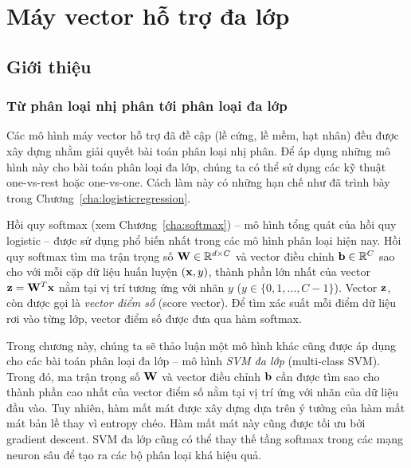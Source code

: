 \chapter{Máy vector hỗ trợ đa lớp}
\label{cha:multisvm}
\section{Giới thiệu }


\subsection{Từ phân loại nhị phân tới phân loại đa lớp}

Các mô hình máy vector hỗ trợ đã đề cập (lề cứng, lề mềm, hạt nhân) đều được xây
dựng nhằm giải quyết bài toán phân loại nhị phân. Để áp dụng những mô hình này
cho bài toán phân loại đa lớp, chúng ta có thể sử dụng các kỹ thuật one-vs-rest
hoặc one-vs-one. Cách làm này có những hạn chế như đã trình bày trong
Chương~\ref{cha:logisticregression}.

Hồi quy softmax (xem Chương~\ref{cha:softmax}) -- mô hình
tổng quát của hồi quy logistic -- được sử dụng phổ biến nhất trong
các mô hình phân loại hiện nay. Hồi quy softmax tìm ma trận trọng số $\mathbf{W} \in \mathbb{R}^{d \times C}$ và vector điều chỉnh $\mathbf{b} \in \mathbb{R}^C$ sao cho với mỗi cặp dữ liệu huấn luyện $(\mathbf{x}, y)$, thành phần lớn nhất của vector $\mathbf{z} = \mathbf{W}^T\mathbf{x}$ nằm tại vị trí tương ứng với nhãn $y$ ($y \in \{0, 1, \dots, C-1\}$). Vector $\mathbf{z}$, còn được gọi là \textit{vector điểm số} (score vector). Để tìm xác suất mỗi điểm dữ liệu rơi vào từng lớp, vector điểm số được đưa qua hàm softmax.


Trong chương này, chúng ta sẽ thảo luận một mô hình khác cũng được áp dụng cho
các bài toán phân loại đa lớp -- mô hình \textit{SVM đa lớp} (multi-class SVM).
Trong đó, ma trận trọng số $\mathbf{W}$ và vector điều chỉnh $\mathbf{b}$ cần được tìm sao cho
thành phần cao nhất của vector điểm số nằm tại vị trí ứng với nhãn của dữ liệu
đầu vào. Tuy nhiên, hàm mất mát được xây dựng dựa trên ý tưởng của hàm mất mát
bản lề thay vì entropy chéo. Hàm mất mát này cũng được tối ưu bởi gradient
descent. SVM đa lớp cũng có thể thay thế tầng softmax trong các mạng neuron sâu
để tạo ra các bộ phân loại khá hiệu quả.





